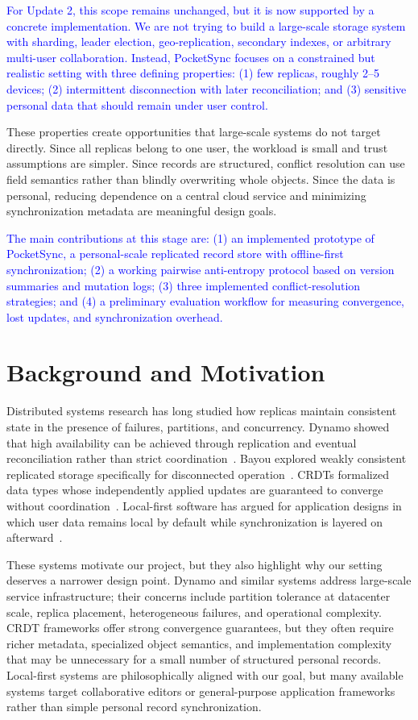 \documentclass[10pt,twocolumn]{article}
\newcommand{\update}[1]{\textcolor{blue}{#1}}
\begin{document}
\update{For Update 2, this scope remains unchanged, but it is now supported by a concrete implementation. We are not trying to build a large-scale storage system with sharding, leader election, geo-replication, secondary indexes, or arbitrary multi-user collaboration. Instead, PocketSync focuses on a constrained but realistic setting with three defining properties: (1) few replicas, roughly 2--5 devices; (2) intermittent disconnection with later reconciliation; and (3) sensitive personal data that should remain under user control.}

These properties create opportunities that large-scale systems do not target directly. Since all replicas belong to one user, the workload is small and trust assumptions are simpler. Since records are structured, conflict resolution can use field semantics rather than blindly overwriting whole objects. Since the data is personal, reducing dependence on a central cloud service and minimizing synchronization metadata are meaningful design goals.

\update{The main contributions at this stage are: (1) an implemented prototype of PocketSync, a personal-scale replicated record store with offline-first synchronization; (2) a working pairwise anti-entropy protocol based on version summaries and mutation logs; (3) three implemented conflict-resolution strategies; and (4) a preliminary evaluation workflow for measuring convergence, lost updates, and synchronization overhead.}

\section{Background and Motivation}

Distributed systems research has long studied how replicas maintain consistent state in the presence of failures, partitions, and concurrency. Dynamo showed that high availability can be achieved through replication and eventual reconciliation rather than strict coordination~\cite{dynamo}. Bayou explored weakly consistent replicated storage specifically for disconnected operation~\cite{bayou}. CRDTs formalized data types whose independently applied updates are guaranteed to converge without coordination~\cite{crdt}. Local-first software has argued for application designs in which user data remains local by default while synchronization is layered on afterward~\cite{localfirst}.

These systems motivate our project, but they also highlight why our setting deserves a narrower design point. Dynamo and similar systems address large-scale service infrastructure; their concerns include partition tolerance at datacenter scale, replica placement, heterogeneous failures, and operational complexity. CRDT frameworks offer strong convergence guarantees, but they often require richer metadata, specialized object semantics, and implementation complexity that may be unnecessary for a small number of structured personal records. Local-first systems are philosophically aligned with our goal, but many available systems target collaborative editors or general-purpose application frameworks rather than simple personal record synchronization.
\end{document}
